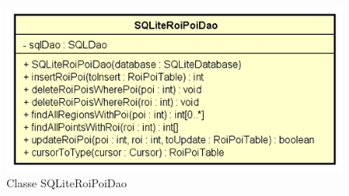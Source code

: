 \documentclass[../DefinizioneDiProdotto.tex]{subfiles}
\begin{document}
    \begin{figure}[H]
        \centering
        \includegraphics{img/SQLiteRoiPoiDao.png}
        \caption{Classe SQLiteRoiPoiDao}\label{fig:model::dataaccess::dao::SQLiteRoiPoiDao} 
    \end{figure}
\end{document}
